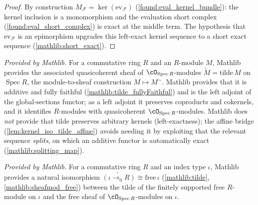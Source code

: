 \begin{proof}
  \leanok
  By construction \(M_{\mathcal F}=\ker(\mathrm{ev}_{\mathcal F})\)
  (\cref{found:eval_kernel_bundle}): the kernel inclusion is a monomorphism and the
  evaluation short complex (\cref{found:eval_short_complex}) is exact at the middle
  term.  The hypothesis that \(\mathrm{ev}_{\mathcal F}\) is an epimorphism upgrades this
  left-exact kernel sequence to a short exact sequence (\cref{mathlib:short_exact}).
\end{proof}


\begin{definition}
  \label{mathlib:tilde}
  \mathlibok
  \textit{Provided by Mathlib.}
  For a commutative ring \(R\) and an \(R\)-module \(M\), Mathlib provides the
  associated quasicoherent sheaf of \(\cO_{\operatorname{Spec}R}\)-modules
  \(\widetilde M=\mathrm{tilde}\,M\) on \(\operatorname{Spec}R\), the
  module-to-sheaf construction \(M\mapsto M^{\sim}\).  Mathlib provides that it is
  additive and fully faithful (\cref{mathlib:tilde_fullyFaithful}) and is the left
  adjoint of the global-sections functor; as a left adjoint it preserves coproducts
  and cokernels, and it identifies \(R\)-modules with quasicoherent
  \(\cO_{\operatorname{Spec}R}\)-modules.  Mathlib does \emph{not} provide that
  \(\mathrm{tilde}\) preserves arbitrary kernels (left-exactness); the affine bridge
  (\cref{lem:kernel_iso_tilde_affine}) avoids needing it by exploiting that the
  relevant sequence \emph{splits}, on which an additive functor is automatically
  exact (\cref{mathlib:splitting_map}).
\end{definition}

\begin{lemma}
  \label{mathlib:tildeFinsupp}
  \mathlibok
  \textit{Provided by Mathlib.}
  For a commutative ring \(R\) and an index type \(\iota\), Mathlib provides a
  natural isomorphism \(\widetilde{(\iota\to_0 R)}\cong\mathrm{free}\,\iota\)
  (\cref{mathlib:tilde}, \cref{mathlib:sheafmod_free}) between the tilde of the
  finitely supported free \(R\)-module on \(\iota\) and the free sheaf of
  \(\cO_{\operatorname{Spec}R}\)-modules on \(\iota\).
\end{lemma}

